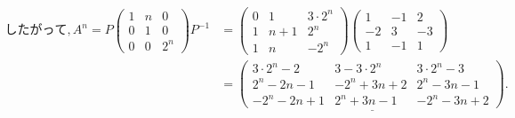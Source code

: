 \documentclass{jsarticle}
\begin{document}
\begin{align*}
したがって, A^n = P\begin{pmatrix} 1 & n & 0 \\ 0 & 1 & 0 \\ 0 & 0 & 2^n \end{pmatrix}P^{-1}
&= \begin{pmatrix} 0 & 1 & 3\cdot2^n \\ 1 & n+1 & 2^n \\ 1 & n & -2^n \end{pmatrix}\begin{pmatrix} 1 & -1 & 2 \\ -2 & 3 & -3 \\ 1 & -1 & 1 \end{pmatrix} \\
&= \underline{\begin{pmatrix} 3\cdot2^n - 2 & 3 - 3 \cdot 2^n & 3 \cdot 2^n - 3 \\ 2^n - 2n - 1 & -2^n + 3n + 2 & 2^n - 3n -1 \\ -2^n - 2n + 1 & 2^n + 3n -1 & -2^n - 3n + 2 \end{pmatrix}.}
\end{align*}
\end{document}
